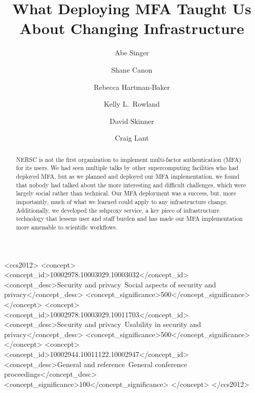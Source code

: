 \documentclass[sigconf,review]{acmart}
\begin{document}
\title{What Deploying MFA Taught Us About Changing Infrastructure}

\author{Abe Singer}

\author{Shane Canon}

\author{Rebecca Hartman-Baker}

\author{Kelly L.\ Rowland}

\author{David Skinner}

\author{Craig Lant}

\begin{abstract}

NERSC is not the first organization to implement multi-factor authentication
(MFA) for its users. We had seen multiple talks by other supercomputing
facilities who had deployed MFA, but as we planned and deployed our MFA
implementation, we found that nobody had talked about the more interesting and
difficult challenges, which were largely social rather than technical. Our MFA
deployment was a success, but, more importantly, much of what we learned could
apply to any infrastructure change. Additionally, we developed the sshproxy
service, a key piece of infrastructure technology that lessens user and staff
burden and has made our MFA implementation more amenable to scientific
workflows.

\end{abstract}

\begin{CCSXML}
<ccs2012>
<concept>
<concept_id>10002978.10003029.10003032</concept_id>
<concept_desc>Security and privacy~Social aspects of security and privacy</concept_desc>
<concept_significance>500</concept_significance>
</concept>
<concept>
<concept_id>10002978.10003029.10011703</concept_id>
<concept_desc>Security and privacy~Usability in security and privacy</concept_desc>
<concept_significance>500</concept_significance>
</concept>
<concept>
<concept_id>10002944.10011122.10002947</concept_id>
<concept_desc>General and reference~General conference proceedings</concept_desc>
<concept_significance>100</concept_significance>
</concept>
</ccs2012>
\end{CCSXML}
\end{document}
